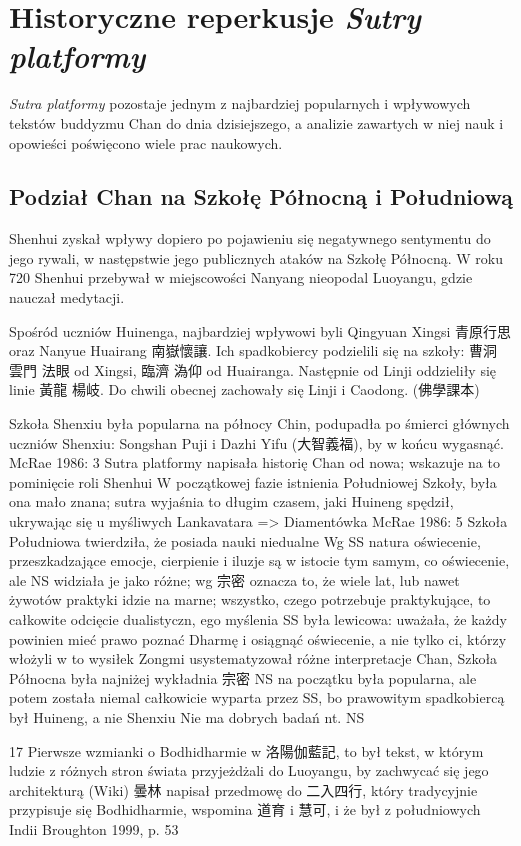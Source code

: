 \chapter{Historyczne reperkusje \textit{Sutry platformy}}
\textit{Sutra platformy} pozostaje jednym z najbardziej popularnych i wpływowych tekstów buddyzmu Chan do dnia dzisiejszego, a analizie zawartych w niej nauk i opowieści poświęcono wiele prac naukowych.

\section{Podział Chan na Szkołę Północną i Południową}
Shenhui zyskał wpływy dopiero po pojawieniu się negatywnego sentymentu do jego rywali, w następstwie jego publicznych ataków na Szkołę Północną.
W roku 720 Shenhui przebywał w miejscowości Nanyang nieopodal Luoyangu, gdzie nauczał medytacji.

Spośród uczniów Huinenga, najbardziej wpływowi byli Qingyuan Xingsi 青原行思 oraz Nanyue Huairang 南嶽懷讓. Ich spadkobiercy podzielili się na szkoły: 曹洞 雲門 法眼 od Xingsi, 臨濟 溈仰 od Huairanga. Następnie od Linji oddzieliły się linie 黃龍 楊岐. Do chwili obecnej zachowały się Linji i Caodong. (佛學課本)

Szkoła Shenxiu była popularna na północy Chin, podupadła po śmierci głównych uczniów Shenxiu: Songshan Puji i Dazhi Yifu (大智義福), by w końcu wygasnąć. %
McRae 1986: 3
Sutra platformy napisała historię Chan od nowa; wskazuje na to pominięcie roli Shenhui
W początkowej fazie istnienia Południowej Szkoły, była ona mało znana; sutra wyjaśnia to długim czasem, jaki Huineng spędził, ukrywając się u myśliwych
Lankavatara => Diamentówka
McRae 1986: 5
Szkoła Południowa twierdziła, że posiada nauki niedualne
Wg SS natura oświecenie, przeszkadzające emocje, cierpienie i iluzje są w istocie tym samym, co oświecenie, ale NS widziała je jako różne; wg 宗密 oznacza to, że wiele lat, lub nawet żywotów praktyki idzie na marne; wszystko, czego potrzebuje praktykujące, to całkowite odcięcie dualistyczn, ego myślenia
SS była lewicowa: uważała, że każdy powinien mieć prawo poznać Dharmę i osiągnąć oświecenie, a nie tylko ci, którzy włożyli w to wysiłek
Zongmi usystematyzował różne interpretacje Chan, Szkoła Północna była najniżej
wykładnia 宗密 NS na początku była popularna, ale potem została niemal całkowicie wyparta przez SS, bo prawowitym spadkobiercą był Huineng, a nie Shenxiu
Nie ma dobrych badań nt. NS

17 Pierwsze wzmianki o Bodhidharmie w 洛陽伽藍記, to był tekst, w którym ludzie z różnych stron świata przyjeżdżali do Luoyangu, by zachwycać się jego architekturą
(Wiki) 曇林 napisał przedmowę do 二入四行, który tradycyjnie przypisuje się Bodhidharmie, wspomina 道育 i 慧可, i że był z południowych Indii Broughton 1999, p. 53

